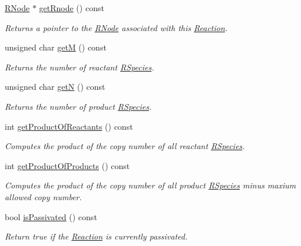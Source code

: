 \begin{DoxyCompactItemize}
\hyperlink{classchem_1_1RNode}{R\-Node} $\ast$ \hyperlink{classchem_1_1Reaction_af12e3997f13ccb476f7bac45297f4ff9}{get\-Rnode} () const 
\begin{DoxyCompactList}\small\item\em Returns a pointer to the \hyperlink{classchem_1_1RNode}{R\-Node} associated with this \hyperlink{classchem_1_1Reaction}{Reaction}. \end{DoxyCompactList}\item 
unsigned char \hyperlink{classchem_1_1Reaction_a5f420aec9fb36444175089ab16ddb141}{get\-M} () const 
\begin{DoxyCompactList}\small\item\em Returns the number of reactant \hyperlink{classchem_1_1RSpecies}{R\-Species}. \end{DoxyCompactList}\item 
unsigned char \hyperlink{classchem_1_1Reaction_a35c63f46973b5cda157661ab9bffb682}{get\-N} () const 
\begin{DoxyCompactList}\small\item\em Returns the number of product \hyperlink{classchem_1_1RSpecies}{R\-Species}. \end{DoxyCompactList}\item 
int \hyperlink{classchem_1_1Reaction_adffedea2cba0124feda82ef9e3cee5e7}{get\-Product\-Of\-Reactants} () const 
\begin{DoxyCompactList}\small\item\em Computes the product of the copy number of all reactant \hyperlink{classchem_1_1RSpecies}{R\-Species}. \end{DoxyCompactList}\item 
int \hyperlink{classchem_1_1Reaction_aa2dcaea0bc0893a3c00cb3cbcd0a2d6c}{get\-Product\-Of\-Products} () const 
\begin{DoxyCompactList}\small\item\em Computes the product of the copy number of all product \hyperlink{classchem_1_1RSpecies}{R\-Species} minus maxium allowed copy number. \end{DoxyCompactList}\item 
bool \hyperlink{classchem_1_1Reaction_a6c03b9b74a8da07b51a6924bfe2f9571}{is\-Passivated} () const 
\begin{DoxyCompactList}\small\item\em Return true if the \hyperlink{classchem_1_1Reaction}{Reaction} is currently passivated. \end{DoxyCompactList}\item 

\end{DoxyCompactItemize}
